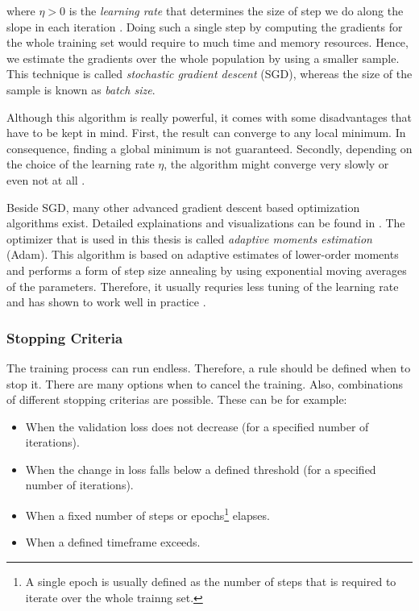 where $ \eta > 0 $ is the \textit{learning rate} that determines the size of step we do along the slope in each iteration \parencite{pattern_and_ml}. Doing such a single step by computing the gradients for the whole training set would require to much time and memory resources. Hence, we estimate the gradients over the whole population by using a smaller sample. This technique is called \textit{stochastic gradient descent} (SGD), whereas the size of the sample is known as \textit{batch size}.

Although this algorithm is really powerful, it comes with some disadvantages that have to be kept in mind. First, the result can converge to any local minimum. In consequence, finding a global minimum is not guaranteed. Secondly, depending on the choice of the learning rate $ \eta $, the algorithm might converge very slowly or even not at all \parencite{ann}.

Beside SGD, many other advanced gradient descent based optimization algorithms exist. Detailed explainations and visualizations can be found in \parencite{optimization}. The optimizer that is used in this thesis is called \textit{adaptive moments estimation} (Adam). This algorithm is based on adaptive estimates of lower-order moments and performs a form of step size annealing by using exponential moving averages of the parameters. Therefore, it usually requries less tuning of the learning rate and has shown to work well in practice \parencite{adam}.


\subsubsection{Stopping Criteria}

The training process can run endless. Therefore, a rule should be defined when to stop it. There are many options when to cancel the training. Also, combinations of different stopping criterias are possible. These can be for example:

\begin{itemize}
\item When the validation loss does not decrease (for a specified number of iterations).
\item When the change in loss falls below a defined threshold (for a specified number of iterations).
\item When a fixed number of steps or epochs\footnote{A single epoch is usually defined as the number of steps that is required to iterate over the whole trainng set.} elapses.
\item When a defined timeframe exceeds.
\end{itemize}


